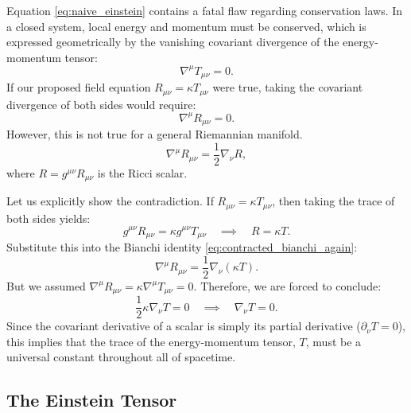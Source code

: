\documentclass[11pt, a4paper]{report}
\begin{document}
Equation \eqref{eq:naive_einstein} contains a fatal flaw regarding conservation laws. In a closed system, local energy and momentum must be conserved, which is expressed geometrically by the vanishing covariant divergence of the energy-momentum tensor:
\begin{equation}
\nabla^{\mu}T_{\mu\nu} = 0. %
\end{equation}
If our proposed field equation $R_{\mu\nu} = \kappa T_{\mu\nu}$ were true, taking the covariant divergence of both sides would require:
\begin{equation}
\nabla^{\mu}R_{\mu\nu} = 0. %
\end{equation}
However, this is not true for a general Riemannian manifold. %
\begin{equation}
\label{eq:contracted_bianchi_again}
\nabla^{\mu}R_{\mu\nu} = \frac{1}{2}\nabla_{\nu}R, %
\end{equation}
where $R = g^{\mu\nu}R_{\mu\nu}$ is the Ricci scalar. 

Let us explicitly show the contradiction. If $R_{\mu\nu} = \kappa T_{\mu\nu}$, then taking the trace of both sides yields:
\begin{equation}
g^{\mu\nu}R_{\mu\nu} = \kappa g^{\mu\nu}T_{\mu\nu} \quad \implies \quad R = \kappa T. %
\end{equation}
Substitute this into the Bianchi identity \eqref{eq:contracted_bianchi_again}:
\begin{equation}
\nabla^{\mu}R_{\mu\nu} = \frac{1}{2}\nabla_{\nu}(\kappa T).
\end{equation}
But we assumed $\nabla^{\mu}R_{\mu\nu} = \kappa \nabla^{\mu}T_{\mu\nu} = 0$. Therefore, we are forced to conclude:
\begin{equation}
\frac{1}{2}\kappa \nabla_{\nu}T = 0 \quad \implies \quad \nabla_{\nu}T = 0. %
\end{equation}
Since the covariant derivative of a scalar is simply its partial derivative ($\partial_{\nu}T = 0$), this implies that the trace of the energy-momentum tensor, $T$, must be a universal constant throughout all of spacetime. %

\subsection{The Einstein Tensor}
\end{document}
